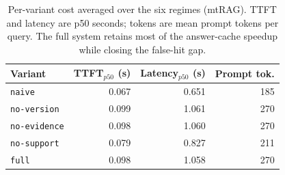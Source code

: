 \begin{table}[t]
\centering\small
\caption{Per-variant cost averaged over the six regimes (mtRAG). TTFT and latency are p50 seconds; tokens are mean prompt tokens per query. The full system retains most of the answer-cache speedup while closing the false-hit gap.}
\label{tab:latency_variant}
\begin{tabular}{l rrr}
\toprule
Variant & TTFT$_{p50}$ (s) & Latency$_{p50}$ (s) & Prompt tok. \\
\midrule
\texttt{naive} & 0.067 & 0.651 & 185 \\
\texttt{no-version} & 0.099 & 1.061 & 270 \\
\texttt{no-evidence} & 0.098 & 1.060 & 270 \\
\texttt{no-support} & 0.079 & 0.827 & 211 \\
\texttt{full} & 0.098 & 1.058 & 270 \\
\bottomrule
\end{tabular}
\end{table}
